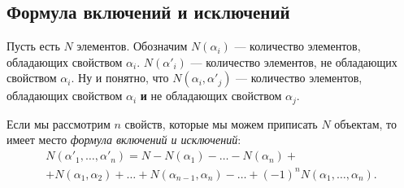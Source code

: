 \subsection{Формула включений и исключений}

Пусть есть $N$ элементов. Обозначим $N(\alpha_i)$ --- количество элементов, обладающих свойством $\alpha_i$. $N(\alpha'_i)$ --- количество элементов, не обладающих свойством $\alpha_i$. Ну и понятно, что $N(\alpha_i, \alpha'_j)$ --- количество элементов, обладающих свойством $\alpha_i$ \textbf{и} не обладающих свойством $\alpha_j$.

\begin{theorem}
	Если мы рассмотрим $n$ свойств, которые мы можем приписать $N$ объектам, то имеет место \textit{формула включений и исключений}:
	\begin{multline*}
		N(\alpha'_1, \ldots, \alpha'_n) = N - N(\alpha_1) - \ldots - N(\alpha_n) + \\ +
		N(\alpha_1, \alpha_2) + \ldots + N(\alpha_{n - 1}, \alpha_n) - \ldots + (-1)^n N(\alpha_1, \ldots, \alpha_n).
	\end{multline*}
\end{theorem}

